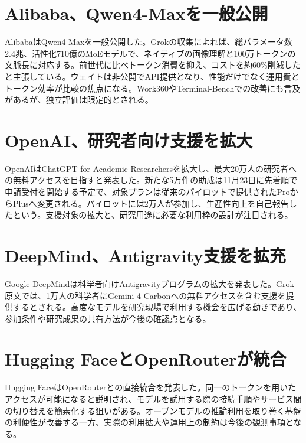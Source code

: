 \section{Alibaba、Qwen4-Maxを一般公開}
AlibabaはQwen4-Maxを一般公開した。Grokの収集によれば、総パラメータ数2.4兆、活性化710億のMoEモデルで、ネイティブの画像理解と100万トークンの文脈長に対応する。前世代に比べトークン消費を抑え、コストを約60\%削減したと主張している。ウェイトは非公開でAPI提供となり、性能だけでなく運用費とトークン効率が比較の焦点になる。Work360やTerminal-Benchでの改善にも言及があるが、独立評価は限定的とされる。

\section{OpenAI、研究者向け支援を拡大}
OpenAIはChatGPT for Academic Researchersを拡大し、最大20万人の研究者への無料アクセスを目指すと発表した。新たな5万件の助成は11月23日に先着順で申請受付を開始する予定で、対象プランは従来のパイロットで提供されたProからPlusへ変更される。パイロットには2万人が参加し、生産性向上を自己報告したという。支援対象の拡大と、研究用途に必要な利用枠の設計が注目される。

\section{DeepMind、Antigravity支援を拡充}
Google DeepMindは科学者向けAntigravityプログラムの拡大を発表した。Grok原文では、1万人の科学者にGemini 4 Carbonへの無料アクセスを含む支援を提供するとされる。高度なモデルを研究現場で利用する機会を広げる動きであり、参加条件や研究成果の共有方法が今後の確認点となる。

\section{Hugging FaceとOpenRouterが統合}
Hugging FaceはOpenRouterとの直接統合を発表した。同一のトークンを用いたアクセスが可能になると説明され、モデルを試用する際の接続手順やサービス間の切り替えを簡素化する狙いがある。オープンモデルの推論利用を取り巻く基盤の利便性が改善する一方、実際の利用拡大や運用上の制約は今後の観測事項となる。

